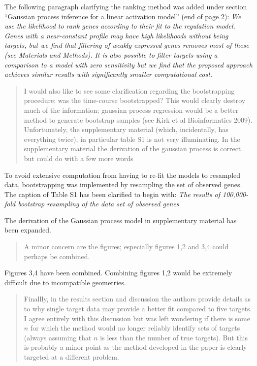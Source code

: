 \documentclass{article}
\begin{document}
The following paragraph clarifying the ranking method was added
under section ``Gaussian process inference for a linear activation
model'' (end of page 2):
\emph{We use the likelihood to rank genes according to their fit to the
regulation model. Genes with a
near-constant profile may have high likelihoods without being targets,
but we find that filtering of weakly expressed genes removes most of
these (see Materials and Methods). It is also possible to filter
targets using a comparison to a model with
zero sensitivity but we find that the proposed approach achieves
similar results with significantly smaller computational cost.}

\begin{quote} I would also like to see some clarification
    regarding the bootstrapping procedure: was the time-course
    bootstrapped? This would clearly destroy much of the information;
    gaussian process regression would be a better method to generate
    bootstrap samples (see Kirk et al Bioinformatics
    2009). Unfortunately, the supplementary material (which,
    incidentally, has everything twice), in particular table S1 is not
    very illuminating. In the supplementary material the derivation of
    the gaussian process is correct but could do with a few more words
  \end{quote}

To avoid extensive computation from having to re-fit the models to
resampled data, bootstrapping was implemented by resampling the set
of observed genes.  The caption of Table S1 has been clarified
to begin with:
\emph{The results of 100,000-fold bootstrap resampling of
the data set of observed genes}

The derivation of the Gaussian process model in supplementary material
has been expanded.

\begin{quote} A minor concern are the figures; especially
    figures 1,2 and 3,4 could perhaps be combined.
  \end{quote}

  Figures 3,4 have been combined. Combining figures 1,2 would be
  extremely difficult due to incompatible geometries.

  \begin{quote} Finallly, in the results section and discussion
    the authors provide details as to why single target data may
    provide a better fit compared to five targets. I agree entirely
    with this discussion but was left wondering if there is some $n$
    for which the method would no longer reliably identify sets of
    targets (always assuming that $n$ is less than the number of true
    targets). But this is probably a minor point as the method
    developed in the paper is clearly targeted at a different problem.
  \end{quote}
\end{document}
